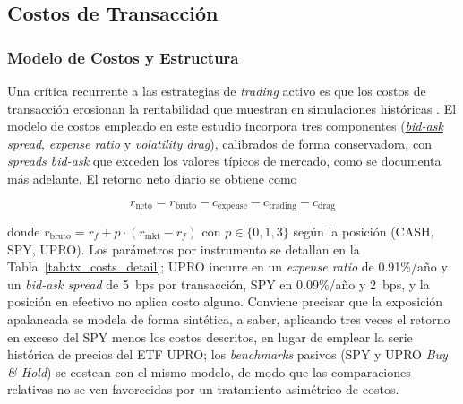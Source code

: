 
\subsection{Costos de Transacci\'on}
\label{sec:costs}


\subsubsection{Modelo de Costos y Estructura}
\label{subsec:costs_intro}

Una cr\'itica recurrente a las estrategias de \textit{trading} activo es que los costos de transacci\'on erosionan la rentabilidad que muestran en simulaciones hist\'oricas \citep{barber2000}. El modelo de costos empleado en este estudio incorpora tres componentes (\hyperlink{glos:spread_bidask}{\textit{bid-ask spread}}, \hyperlink{glos:expense_ratio}{\textit{expense ratio}} y \hyperlink{glos:vol_drag}{\textit{volatility drag}}), calibrados de forma conservadora, con \textit{spreads bid-ask} que exceden los valores t\'ipicos de mercado, como se documenta m\'as adelante. El retorno neto diario se obtiene como

\begin{equation}
r_{\text{neto}} = r_{\text{bruto}} - c_{\text{expense}} - c_{\text{trading}} - c_{\text{drag}}
\label{eq:net_return}
\end{equation}

donde $r_{\text{bruto}} = r_f + p \cdot (r_{\text{mkt}} - r_f)$ con $p \in \{0, 1, 3\}$ seg\'un la posici\'on (CASH, SPY, UPRO). Los par\'ametros por instrumento se detallan en la Tabla~\ref{tab:tx_costs_detail}; UPRO incurre en un \textit{expense ratio} de 0.91\%/a\~no y un \textit{bid-ask spread} de 5~bps por transacci\'on, SPY en 0.09\%/a\~no y 2~bps, y la posici\'on en efectivo no aplica costo alguno. Conviene precisar que la exposici\'on apalancada se modela de forma sint\'etica, a saber, aplicando tres veces el retorno en exceso del SPY menos los costos descritos, en lugar de emplear la serie hist\'orica de precios del ETF UPRO; los \textit{benchmarks} pasivos (SPY y UPRO \textit{Buy \& Hold}) se costean con el mismo modelo, de modo que las comparaciones relativas no se ven favorecidas por un tratamiento asim\'etrico de costos.


